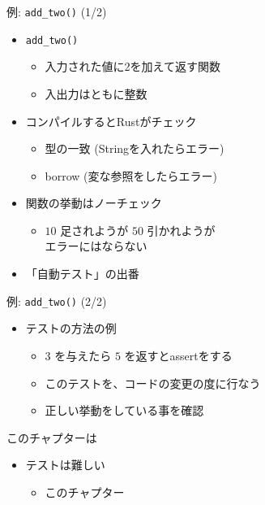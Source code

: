 \documentclass[cjk,14pt,xcolor=dvipsnames,table,dvipdfmx,professional font,t,fragile]{beamer}
\begin{document}
\begin{frame}{例: \texttt{add\_two()} (1/2)}
 \begin{itemize}
  \item \texttt{add\_two()}
	\begin{itemize}
	 \item 入力された値に2を加えて返す関数
	 \item 入出力はともに整数
	\end{itemize}
  \item コンパイルするとRustがチェック
	\begin{itemize}
	 \item 型の一致 (Stringを入れたらエラー)
	 \item borrow (変な参照をしたらエラー)
	\end{itemize}
  \item 関数の挙動はノーチェック
	\begin{itemize}
	 \item $10$ 足されようが $50$ 引かれようが\\
	       エラーにはならない
	\end{itemize}
  \item 「自動テスト」の出番
 \end{itemize}
\end{frame}

\begin{frame}{例: \texttt{add\_two()} (2/2)}
 \begin{itemize}
  \item テストの方法の例
	\begin{itemize}
	 \item $3$ を与えたら $5$ を返すとassertをする
	 \item このテストを、コードの変更の度に行なう
	 \item 正しい挙動をしている事を確認
	\end{itemize}
 \end{itemize}
\end{frame}

\begin{frame}{このチャプターは}
 \begin{itemize}
  \item テストは難しい
	\begin{itemize}
	 \item このチャプター
	\end{itemize}
 \end{itemize}
\end{frame}
\end{document}

